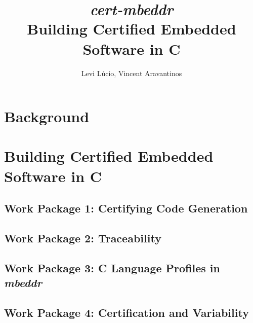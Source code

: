 \documentclass{llncs}
\begin{document}
%
\frontmatter          %
%
\pagestyle{headings}  %

\mainmatter              %
%
\title{\emph{cert-mbeddr}\\Building Certified Embedded Software in C}


\author{Levi L{\'u}cio, Vincent Aravantinos}


\maketitle              %
\setcounter{footnote}{0}

\section{Background} 
\label{sec:background} 



\section{Building Certified Embedded Software in C}
\label{sec:project_certification} 



\subsection{Work Package 1: Certifying Code Generation}
\label{sec:wp1}
 


\subsection{Work Package 2: Traceability}
\label{sec:wp2}
 


\subsection{Work Package 3: C Language Profiles in \emph{mbeddr}}
\label{sec:wp3}
 


\subsection{Work Package 4: Certification and Variability}
\label{sec:wp4}
  
\end{document}

